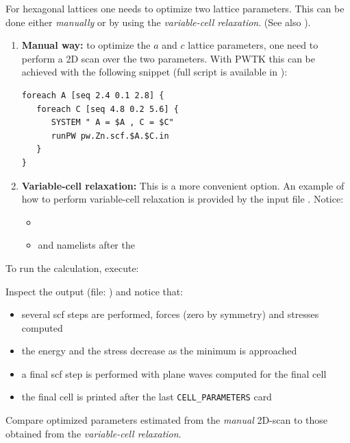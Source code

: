 \documentclass[landscape]{foils}
\begin{document}
For hexagonal lattices one needs to optimize two lattice
parameters. This can be done either {\em manually} or by using the
{\em variable-cell relaxation}. (See also ).
\vspace{-1em}
\begin{enumerate}
\item {\bf Manual way:} to optimize the $a$ and $c$ lattice
  parameters, one need to perform a 2D scan over the two
  parameters. With PWTK this can be achieved with the following
  snippet (full script is available in
  ):
  \vspace{-0.5em}
  {\codecolor
\begin{verbatim}
foreach A [seq 2.4 0.1 2.8] {
   foreach C [seq 4.8 0.2 5.6] {
      SYSTEM " A = $A , C = $C"        
      runPW pw.Zn.scf.$A.$C.in
   }
}
\end{verbatim}
  }
\item {\bf Variable-cell relaxation:} This is a more convenient
  option. An example of how to perform variable-cell relaxation is
  provided by the input file . Notice:
  \begin{itemize}
  \item {}
  \item {} and  namelists after the 
  \end{itemize}
\end{enumerate}
To run the calculation, execute:\\[0.5em]

Inspect the output (file: ) and notice that:
\vspace{-1em}
\begin{itemize}
  \item several scf steps are performed, forces (zero by symmetry) 
    and stresses computed
    \vspace{-1em}
  \item the energy and the stress decrease as the minimum is approached
    \vspace{-1em}
  \item a final scf step is performed with plane waves computed for
    the final cell
    \vspace{-1em}
  \item the final cell is printed after the last \texttt{CELL\_PARAMETERS}
    card
  \end{itemize}
  Compare optimized parameters estimated from the {\em manual} 2D-scan
  to those obtained from the  {\em variable-cell relaxation}.
\end{document}
